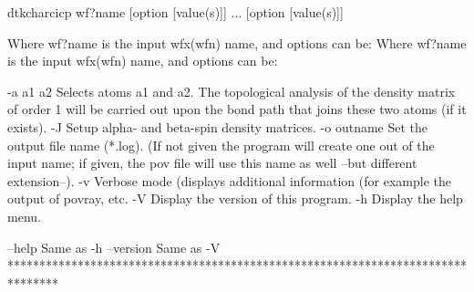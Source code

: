 	dtkcharcicp wf?name [option [value(s)]] ... [option [value(s)]]

Where wf?name is the input wfx(wfn) name, and options can be:
Where wf?name is the input wfx(wfn) name, and options can be:

  -a a1 a2  	Selects atoms a1 and a2. The topological analysis of the
            	  density matrix of order 1 will be carried out upon
            	  the bond path that joins these two atoms (if it exists).
  -J        	Setup alpha- and beta-spin density matrices.
  -o outname	Set the output file name (*.log).
            	  (If not given the program will create one out of
            	  the input name; if given, the pov file will
            	  use this name as well --but different extension--).
  -v     	Verbose mode (displays additional information (for example the 
         	  output of povray, etc.
  -V        	Display the version of this program.
  -h		Display the help menu.

  --help    		Same as -h
  --version 		Same as -V
********************************************************************************
